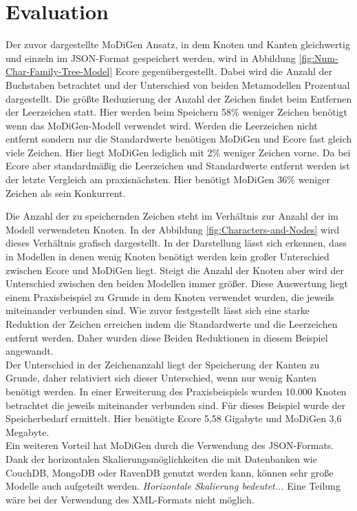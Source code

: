 \section{Evaluation} \label{sec:evaluation}
Der zuvor dargestellte MoDiGen Ansatz, in dem Knoten und Kanten gleichwertig und einzeln im JSON-Format gespeichert werden, wird in Abbildung \ref{fig:Num-Char-Family-Tree-Model} Ecore gegenübergestellt. Dabei wird die Anzahl der Buchstaben betrachtet und der Unterschied von beiden Metamodellen Prozentual dargestellt. Die größte Reduzierung der Anzahl der Zeichen findet beim Entfernen der Leerzeichen statt. Hier werden beim Speichern 58\% weniger Zeichen benötigt wenn das MoDiGen-Modell verwendet wird. Werden die Leerzeichen nicht entfernt sondern nur die Standardwerte benötigen MoDiGen und Ecore fast gleich viele Zeichen. Hier liegt MoDiGen lediglich mit 2\% weniger Zeichen vorne. Da bei Ecore aber standardmäßig die Leerzeichen und Standardwerte entfernt werden ist der letzte Vergleich am praxisnächsten. Hier benötigt MoDiGen 36\% weniger Zeichen als sein Konkurrent.

Die Anzahl der zu speichernden Zeichen steht im Verhältnis zur Anzahl der im Modell verwendeten Knoten. 
In der Abbildung \ref{fig:Characters-and-Nodes} wird dieses Verhältnis grafisch dargestellt. In der Darstellung lässt sich erkennen, dass in Modellen in denen wenig Knoten benötigt werden kein großer Unterschied zwischen Ecore und MoDiGen liegt. Steigt die Anzahl der Knoten aber wird der Unterschied zwischen den beiden Modellen immer größer. Diese Auswertung liegt einem Praxisbeispiel zu Grunde in dem Knoten verwendet wurden, die jeweils miteinander verbunden sind. Wie zuvor festgestellt lässt sich eine starke Reduktion der Zeichen erreichen indem die Standardwerte und die Leerzeichen entfernt werden. Daher wurden diese Beiden Reduktionen in diesem Beispiel angewandt.\\
Der Unterschied in der Zeichenanzahl liegt der Speicherung der Kanten zu Grunde, daher relativiert sich dieser Unterschied, wenn nur wenig Kanten benötigt werden. In einer Erweiterung des Praxisbeispiels wurden 10.000 Knoten betrachtet die jeweils miteinander verbunden sind. Für dieses Beispiel wurde der Speicherbedarf ermittelt. Hier benötigte Ecore 5,58 Gigabyte und MoDiGen 3,6 Megabyte.\\
Ein weiteren Vorteil hat MoDiGen durch die Verwendung des JSON-Formats. Dank der horizontalen Skalierungsmöglichkeiten die mit Datenbanken wie CouchDB, MongoDB oder RavenDB genutzt werden kann, können sehr große Modelle auch aufgeteilt werden. \textit{Horizontale Skalierung bedeutet...} Eine Teilung wäre bei der Verwendung des XML-Formats nicht möglich. 


